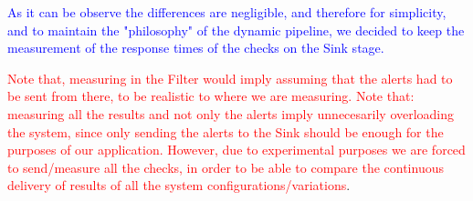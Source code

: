 \textcolor{blue}{As it can be observe the differences are negligible, and therefore for simplicity, and to maintain the "philosophy" of the dynamic pipeline, we decided to keep the measurement of the response times of the checks on the Sink stage.}

\textcolor{red}{Note that, measuring in the Filter would imply assuming that the alerts had to be sent from there, to be realistic to where we are measuring.}
\textcolor{red}{Note that: measuring all the results and not only the alerts imply unnecesarily overloading the system, since only sending the alerts to the Sink should be enough for the purposes of our application. However, due to experimental purposes we are forced to send/measure all the checks, in order to be able to compare the continuous delivery of results of all the system configurations/variations}.

